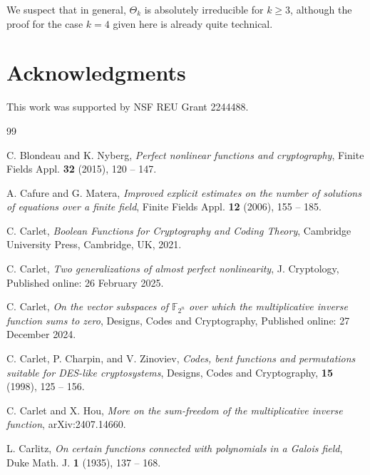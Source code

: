 \documentclass{amsart}
\numberwithin{equation}{section}
\theoremstyle{definition}
\begin{document}
We suspect that in general, $\Theta_k$ is absolutely irreducible for $k\ge 3$, although the proof for the case $k=4$ given here is already quite technical. 


\section*{Acknowledgments}

This work was supported by NSF REU Grant 2244488.



\begin{thebibliography}{99}

C. Blondeau and K. Nyberg, {\it Perfect nonlinear functions and cryptography}, Finite Fields Appl. {\bf 32} (2015), 120 -- 147.

A. Cafure and G. Matera, {\it Improved explicit estimates on the number of solutions of equations over a finite field}, Finite Fields Appl.  {\bf 12} (2006), 155 -- 185.

C. Carlet, {\it Boolean Functions for Cryptography and Coding Theory}, Cambridge University Press, Cambridge, UK, 2021.

C. Carlet,  {\it Two generalizations of almost perfect nonlinearity}, J. Cryptology,
Published online: 26 February 2025.%

C. Carlet, {\it On the vector subspaces of $\mathbb F_{2^n}$ over which the multiplicative inverse function sums to zero}, Designs, Codes and Cryptography, Published online: 27 December 2024. %

C. Carlet, P. Charpin, and V. Zinoviev, {\it Codes, bent functions and permutations suitable for DES-like cryptosystems}, Designs, Codes and Cryptography, {\bf 15} (1998), 125 -- 156.

C. Carlet and X. Hou, {\it More on the sum-freedom of the multiplicative inverse function}, arXiv:2407.14660.


L. Carlitz, {\it On certain functions connected with polynomials in a Galois field}, Duke Math. J. {\bf 1} (1935), 137 -- 168.


\end{thebibliography}
\end{document}
